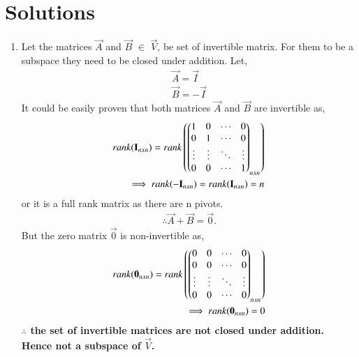 \documentclass[journal,12pt,twocolumn]{IEEEtran}
\begin{document}
\section{Solutions}
\begin{enumerate}
\item Let the matrices $\vec{A}$ and $\vec{B}$ $\in$ $\vec{V}$, be set of invertible matrix. For them to be a subspace they need to be closed under addition.
Let,
\begin{align}
\vec{A} = \vec{I}\\
\vec{B} = -\vec{I}
\end{align}  
It could be easily proven that both matrices $\vec{A}$ and $\vec{B}$ are invertible as,
\begin{align}
rank(\mathbf{I}_{nxn}) = rank\left(\begin{pmatrix}1&0&\cdots&0\\0&1&\cdots&0\\\vdots&\vdots&\ddots&\vdots\\0&0&\cdots&1\end{pmatrix}_{nxn}\right)\\\implies rank(\mathbf{-I}_{nxn}) = rank(\mathbf{I}_{nxn}) = n
\label{i}
\end{align} 
or it is a full rank matrix as there are n pivots.
\begin{align}
\therefore\vec{A}+\vec{B} = \vec{0}. 
\end{align} 
But the zero matrix $\vec{0}$ is non-invertible as,
\begin{align}
rank(\mathbf{0}_{nxn}) = rank\left(\begin{pmatrix}0&0&\cdots&0\\0&0&\cdots&0\\\vdots&\vdots&\ddots&\vdots\\0&0&\cdots&0\end{pmatrix}_{nxn}\right)\\\implies rank(\mathbf{0}_{nxn}) = 0
\end{align} 
\textbf{$\therefore$ the set of invertible matrices are not closed under addition. Hence not a subspace of $\vec{V}$.}


\end{enumerate}
\end{document}
